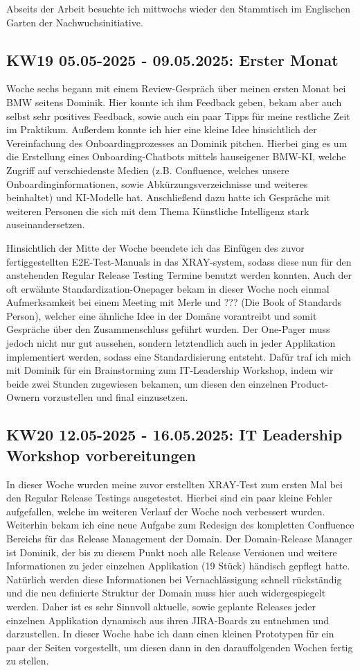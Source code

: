 Abseits der Arbeit besuchte ich mittwochs wieder den Stammtisch im Englischen Garten der Nachwuchsinitiative.


\subsection{KW19 05.05-2025 - 09.05.2025: Erster Monat}
Woche sechs begann mit einem Review-Gespräch über meinen ersten Monat bei BMW seitens Dominik. 
Hier konnte ich ihm Feedback geben, bekam aber auch selbst sehr positives Feedback, sowie auch ein paar Tipps für meine restliche Zeit im Praktikum.
Außerdem konnte ich hier eine kleine Idee hinsichtlich der Vereinfachung des Onboardingprozesses an Dominik pitchen. 
Hierbei ging es um die Erstellung eines Onboarding-Chatbots mittels hauseigener BMW-KI, welche Zugriff auf verschiedenste Medien (z.B. Confluence, welches unsere Onboardinginformationen, sowie Abkürzungsverzeichnisse und weiteres beinhaltet) und KI-Modelle hat.
Anschließend dazu hatte ich Gespräche mit weiteren Personen die sich mit dem Thema Künstliche Intelligenz stark auseinandersetzen.

Hinsichtlich der Mitte der Woche beendete ich das Einfügen des zuvor fertiggestellten \ac{E2E}-Test-Manuals in das XRAY-system, sodass diese nun für den anstehenden Regular Release Testing Termine benutzt werden konnten.
Auch der oft erwähnte Standardization-Onepager bekam in dieser Woche noch einmal Aufmerksamkeit bei einem Meeting mit Merle und ??? (Die Book of Standards Person), welcher eine ähnliche Idee in der Domäne vorantreibt und somit Gespräche über den Zusammenschluss geführt wurden.
Der One-Pager muss jedoch nicht nur gut aussehen, sondern letztendlich auch in jeder Applikation implementiert werden, sodass eine Standardisierung entsteht.
Dafür traf ich mich mit Dominik für ein Brainstorming zum IT-Leadership Workshop, indem wir beide zwei Stunden zugewiesen bekamen, um diesen den einzelnen Product-Ownern vorzustellen und final einzusetzen.


\subsection{KW20 12.05-2025 - 16.05.2025: IT Leadership Workshop vorbereitungen}
In dieser Woche wurden meine zuvor erstellten XRAY-Test zum ersten Mal bei den Regular Release Testings ausgetestet.
Hierbei sind ein paar kleine Fehler aufgefallen, welche im weiteren Verlauf der Woche noch verbessert wurden.
Weiterhin bekam ich eine neue Aufgabe zum Redesign des kompletten Confluence Bereichs für das Release Management der Domain.
Der Domain-Release Manager ist Dominik, der bis zu diesem Punkt noch alle Release Versionen und weitere Informationen zu jeder einzelnen Applikation (19 Stück) händisch gepflegt hatte.
Natürlich werden diese Informationen bei Vernachlässigung schnell rückständig und die neu definierte Struktur der Domain muss hier auch widergespiegelt werden.
Daher ist es sehr Sinnvoll aktuelle, sowie geplante Releases jeder einzelnen Applikation dynamisch aus ihren JIRA-Boards zu entnehmen und darzustellen. 
In dieser Woche habe ich dann einen kleinen Prototypen für ein paar der Seiten vorgestellt, um diesen dann in den darauffolgenden Wochen fertig zu stellen.

